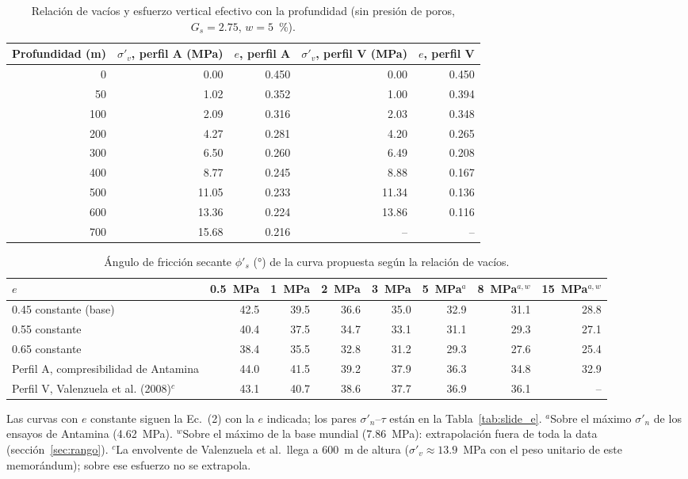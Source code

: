 \documentclass[11pt,letterpaper]{article}
\begin{document}
\begin{table}[!htbp]\centering\small\caption{Relación de vacíos y esfuerzo vertical efectivo con la profundidad (sin presión de poros, $G_s = 2.75$, $w = 5$~\%).}\label{tab:ez}
\begin{tabular}{rrrrr}\toprule Profundidad (m) & $\sigma'_v$, perfil A (MPa) & $e$, perfil A & $\sigma'_v$, perfil V (MPa) & $e$, perfil V\\\midrule
0 & 0.00 & 0.450 & 0.00 & 0.450 \\
50 & 1.02 & 0.352 & 1.00 & 0.394 \\
100 & 2.09 & 0.316 & 2.03 & 0.348 \\
200 & 4.27 & 0.281 & 4.20 & 0.265 \\
300 & 6.50 & 0.260 & 6.49 & 0.208 \\
400 & 8.77 & 0.245 & 8.88 & 0.167 \\
500 & 11.05 & 0.233 & 11.34 & 0.136 \\
600 & 13.36 & 0.224 & 13.86 & 0.116 \\
700 & 15.68 & 0.216 & -- & -- \\
\bottomrule\end{tabular}\end{table}

\begin{table}[!htbp]\centering\small\caption{Ángulo de fricción secante $\phi'_s$ (°) de la curva propuesta según la relación de vacíos.}\label{tab:etau}
\setlength{\tabcolsep}{3pt}\begin{tabular}{lrrrrrrr}\toprule $e$ & 0.5~MPa & 1~MPa & 2~MPa & 3~MPa & 5~MPa$^{a}$ & 8~MPa$^{a,w}$ & 15~MPa$^{a,w}$\\\midrule
0.45 constante (base) & 42.5 & 39.5 & 36.6 & 35.0 & 32.9 & 31.1 & 28.8 \\
0.55 constante & 40.4 & 37.5 & 34.7 & 33.1 & 31.1 & 29.3 & 27.1 \\
0.65 constante & 38.4 & 35.5 & 32.8 & 31.2 & 29.3 & 27.6 & 25.4 \\
Perfil A, compresibilidad de Antamina & 44.0 & 41.5 & 39.2 & 37.9 & 36.3 & 34.8 & 32.9 \\
Perfil V, Valenzuela et al. (2008)$^{c}$ & 43.1 & 40.7 & 38.6 & 37.7 & 36.9 & 36.1 & -- \\
\bottomrule\end{tabular}\par\vspace{3pt}\footnotesize Las curvas con $e$ constante siguen la Ec.~(2) con la $e$ indicada; los pares $\sigma'_n$--$\tau$ están en la Tabla~\ref{tab:slide_e}. $^{a}$Sobre el máximo $\sigma'_n$ de los ensayos de Antamina (4.62~MPa). $^{w}$Sobre el máximo de la base mundial (7.86~MPa): extrapolación fuera de toda la data (sección~\ref{sec:rango}). $^{c}$La envolvente de Valenzuela et al.\ llega a 600~m de altura ($\sigma'_v \approx 13.9$~MPa con el peso unitario de este memorándum); sobre ese esfuerzo no se extrapola.\end{table}
\end{document}
